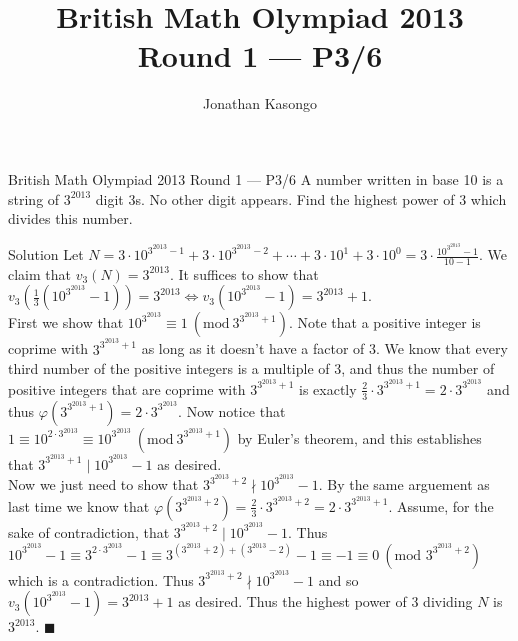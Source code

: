 \documentclass{article}
\author{Jonathan Kasongo}
\title{British Math Olympiad 2013 Round 1 --- P3/6}
\begin{document}
\maketitle

\begin{problem}{British Math Olympiad 2013 Round 1 --- P3/6}
A number written in base 10 is a string of $3^{2013}$ digit 3s. No other
digit appears. Find the highest power of 3 which divides this number.
\end{problem}

\begin{solution}{Solution}
Let $N = 3\cdot 10^{3^{2013} - 1} + 3\cdot 10^{3^{2013} - 2} +
\cdots + 3\cdot 10^1 + 3\cdot 10^0 = 3\cdot
\frac{10^{3^{2013}} - 1}{10 - 1}$. We claim that $v_3 (N) = 3^{2013}$.
It suffices to show that $v_3 \left(\frac{1}{3} \left( 10^{3^{2013}} - 1
\right) \right) = 3^{2013} \iff v_3 \left(10^{3^{2013}} - 1\right) =
{3^{2013} + 1}$. \\

First we show that $10^{3^{2013}} \equiv 1 \ \left(\text{mod} \
3^{3^{2013}+1}\right)$. Note that a positive integer is coprime with
$3^{3^{2013}+1}$ as long as it doesn't have a factor of 3. We know that
every third number of the
positive integers is a multiple of 3, and thus the number of positive
integers that are coprime with $3^{3^{2013} + 1}$ is exactly $\frac{2}{3} \cdot
3^{3^{2013} + 1} = 2 \cdot 3^{3^{2013}}$ and thus $\varphi \left(
3^{3^{2013}+1}\right) = 2 \cdot 3^{3^{2013}}$. Now notice that
$1 \equiv 10^{2\cdot 3^{2013}} \equiv 10^{3^{2013}} \ \left(\text{mod} \
3^{3^{2013}+1} \right)$ by Euler's theorem, and this establishes
that $3^{3^{2013} + 1} \mid 10^{3^{2013}} - 1$ as desired. \\

Now we just need to show that $3^{3^{2013} + 2} \nmid 10^{3^{2013}} - 1$.
By the same arguement as last time we know that
$\varphi \left( 3^{3^{2013} + 2} \right) = \frac{2}{3} \cdot
3^{3^{2013} + 2} = 2 \cdot 3^{3^{2013} + 1}$. Assume, for the sake of
contradiction, that $3^{3^{2013} + 2} \mid 10^{3^{2013}} - 1$. Thus
$10^{3^{2013}} - 1 \equiv 3^{2\cdot 3^{2013}} - 1 \equiv
3^{(3^{2013} + 2) + (3^{2013} - 2)} - 1 \equiv -1 \equiv 0 \
\left(\text{mod }  3^{3^{2013} + 2}\right)$ which is a contradiction.
Thus $3^{3^{2013} + 2} \nmid 10^{3^{2013}} - 1$ and so
$v_3 \left(10^{3^{2013}} - 1\right) = {3^{2013} + 1}$ as desired. Thus the
highest power of 3 dividing $N$ is $3^{2013}$. $\blacksquare$
\end{solution}
\end{document}
